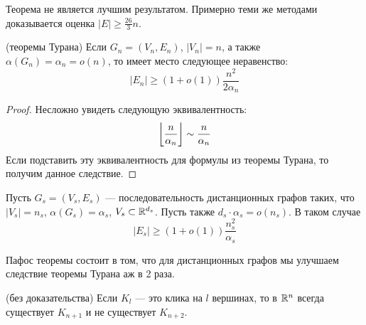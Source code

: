 \begin{note}
	Теорема не является лучшим результатом. Примерно теми же методами доказывается оценка $|E| \ge \frac{26}{3}n$.
\end{note}

\begin{corollary} (теоремы Турана)
	Если $G_n = (V_n, E_n)$, $|V_n| = n$, а также $\alpha(G_n) = \alpha_n = o(n)$, то имеет место следующее неравенство:
	\[
		|E_n| \ge (1 + o(1))\frac{n^2}{2\alpha_n}
	\]
\end{corollary}

\begin{proof}
	Несложно увидеть следующую эквивалентность:
	\[
		\left\lfloor \frac{n}{\alpha_n} \right\rfloor \sim \frac{n}{\alpha_n}
	\]
	Если подставить эту эквивалентность для формулы из теоремы Турана, то получим данное следствие.
\end{proof}

\begin{theorem}
	Пусть $G_s = (V_s, E_s)$ --- последовательность дистанционных графов таких, что $|V_s| = n_s$, $\alpha(G_s) = \alpha_s$, $V_s \subset \mathbb{R}^{d_s}$. Пусть также $d_s \cdot \alpha_s = o(n_s)$. В таком случае
	\[
		|E_s| \ge (1 + o(1)) \frac{n^2_s}{\alpha_s}
	\]
\end{theorem}

\begin{note}
	Пафос теоремы состоит в том, что для дистанционных графов мы улучшаем следствие теоремы Турана аж в 2 раза.
\end{note}

\begin{lemma} (без доказательства)
	Если $K_l$ --- это клика на $l$ вершинах, то в $\mathbb{R}^n$ всегда существует $K_{n + 1}$ и не существует $K_{n + 2}$.
\end{lemma}


